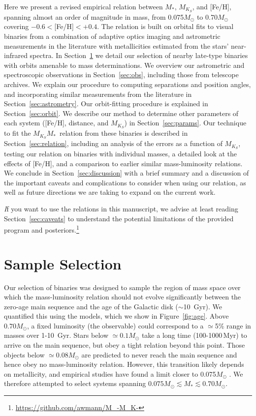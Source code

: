 \documentclass[twocolumn]{aastex62}
\newcommand{\mks}{$M_{K_S}$}
\newcommand{\mmk}{$M_{K_S}$\textendash$M_*$}
\begin{document}
Here we present a revised empirical relation between $M_*$, $M_{K_S}$, and [Fe/H], spanning almost an order of magnitude in mass, from 0.075$M_\odot$ to 0.70$M_\odot$ covering $-0.6<$[Fe/H]$<+0.4$. The relation is built on orbital fits to visual binaries from a combination of adaptive optics imaging and astrometric measurements in the literature with metallicities estimated from the stars' near-infrared spectra. In Section~\ref{sec:targets} we detail our selection of nearby late-type binaries with orbits amenable to mass determinations. We overview our astrometric and spectroscopic observations in Section~\ref{sec:obs}, including those from telescope archives. We explain our procedure to computing separations and position angles, and incorporating similar measurements from the literature in Section~\ref{sec:astrometry}. Our orbit-fitting procedure is explained in Section~\ref{sec:orbit}. We describe our method to determine other parameters of each system ([Fe/H], distance, and \mks) in Section~\ref{sec:params}. Our technique to fit the \mmk\ relation from these binaries is described in Section~\ref{sec:relation}, including an analysis of the errors as a function of \mks, testing our relation on binaries with individual masses, a detailed look at the effects of [Fe/H], and a comparison to earlier similar mass-luminosity relations. We conclude in Section~\ref{sec:discussion} with a brief summary and a discussion of the important caveats and complications to consider when using our relation, as well as future directions we are taking to expand on the current work.

 {\textit If you want to use the relations in this manuscript, we advise at least reading Section~\ref{sec:caveats} to understand the potential limitations of the provided program and posteriors.\footnote{\href{https://github.com/awmann/M_-M_K-}{https://github.com/awmann/M\_-M\_K-}}}%


\section{Sample Selection}\label{sec:targets}
Our selection of binaries was designed to sample the region of mass space over which the mass-luminosity relation should not evolve significantly between the zero-age main sequence and the age of the Galactic disk ($\sim$10~Gyr). We quantified this using the \citet{BHAC15} models, which we show in Figure~\ref{fig:age}. Above $0.70M_\odot$, a fixed luminosity (the observable) could correspond to a $\simeq$5\% range in masses over 1-10\, Gyr. Stars below $\simeq0.1M_\odot$ take a long time (100-1000\,Myr) to arrive on the main sequence, but obey a tight relation beyond this point. Those objects below $\simeq0.08M_\odot$ are predicted to never reach the main sequence and hence obey no mass-luminosity relation. However, this transition likely depends on metallicity, and empirical studies have found a limit closer to 0.075$M_\odot$ \citep[e.g.,][]{Dieterich2014,Dupuy2017}. We therefore attempted to select systems spanning $0.075M_\odot \lesssim M_* \lesssim 0.70M_\odot$.
\end{document}
